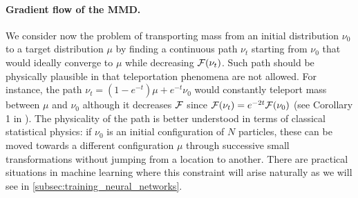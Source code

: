 \paragraph{Gradient flow of the MMD.}\label{paragraph:flow_MMD}
We consider now the problem of transporting mass from an initial distribution $\nu_0$ to a target distribution $\mu$ by finding a continuous path $\nu_t$ starting from $\nu_0$ that would ideally converge to $\mu$ while decreasing ${{\mathcal F}}(\nu_t)$. Such path should be physically plausible in that  teleportation phenomena are not allowed. For instance, the path $\nu_t = (1-e^{-t})\mu + e^{-t}\nu_0$ would constantly teleport mass between $\mu$ and $\nu_0$ although it decreases  ${{\mathcal F}}$ since ${{\mathcal F}}(\nu_t)=e^{-2t}{{\mathcal F}}(\nu_0)$ (see Corollary 1 in \cite{mroueh2018regularized}). The physicality of the path is better understood in terms of classical statistical physics: if $\nu_0$ is an initial configuration of $N$ particles, these can be moved towards a different configuration $\mu$ through successive small transformations without jumping from a location to another. There are practical situations in machine learning where this constraint will arise naturally as we will see in \cref{subsec:training_neural_networks}. 


